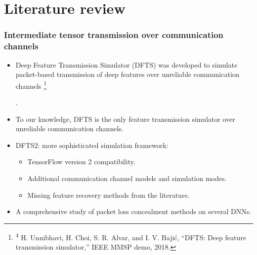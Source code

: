 \documentclass[aspectratio=169]{beamer}
\newcommand\blfootnote[1]{%
	\begingroup
	\renewcommand\thefootnote{}\footnote{#1}%
	\addtocounter{footnote}{-1}%
	\endgroup
}
\begin{document}

\section{Literature review}

\begin{frame}
\frametitle{Intermediate tensor transmission over communication channels}
	\begin{itemize}
	\item Deep Feature Transmission Simulator (DFTS) was developed to simulate packet-based transmission of deep features over unreliable communication channels \blfootnote{\tiny \textsuperscript{4} H. Unnibhavi, H. Choi, S. R. Alvar, and I. V. Bajić, “DFTS: Deep feature transmission simulator,” IEEE MMSP demo, 2018.} \cite{unnibhavi2018dfts}.
	\item To our knowledge, DFTS is the only feature transmission simulator over unreliable communication channels.
	\item DFTS2: more sophisticated simulation framework:
	\begin{itemize}
	    \item TensorFlow version 2 compatibility.
	    \item Additional communication channel models and simulation modes.
	    \item Missing feature recovery methods from the literature.
	\end{itemize}
	\item A comprehensive study of packet loss concealment methods on several DNNs.
	\end{itemize}
\end{frame}
\end{document}
